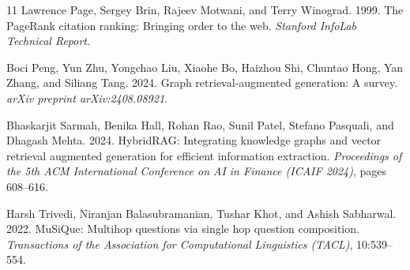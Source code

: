 \documentclass[runningheads]{llncs}
\begin{document}
\begin{thebibliography}{11}
Lawrence Page, Sergey Brin, Rajeev Motwani, and Terry Winograd. 1999.
 The PageRank citation ranking: Bringing order to the web.
 \emph{Stanford InfoLab Technical Report}.

Boci Peng, Yun Zhu, Yongchao Liu, Xiaohe Bo, Haizhou Shi, Chuntao Hong, Yan Zhang, and Siliang Tang. 2024.
 Graph retrieval-augmented generation: A survey.
 \emph{arXiv preprint arXiv:2408.08921}.

Bhaskarjit Sarmah, Benika Hall, Rohan Rao, Sunil Patel, Stefano Pasquali, and Dhagash Mehta. 2024.
 HybridRAG: Integrating knowledge graphs and vector retrieval augmented generation for efficient information extraction.
 \emph{Proceedings of the 5th ACM International Conference on AI in Finance (ICAIF 2024)}, pages 608--616.

Harsh Trivedi, Niranjan Balasubramanian, Tushar Khot, and Ashish Sabharwal. 2022.
 MuSiQue: Multihop questions via single hop question composition.
 \emph{Transactions of the Association for Computational Linguistics (TACL)}, 10:539--554.

\end{thebibliography}
\end{document}
